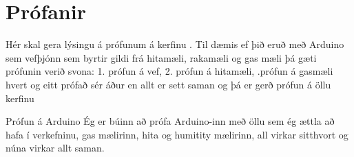 \section{Prófanir}
Hér skal gera lýsingu á prófunum á kerfinu . Til dæmis ef þið eruð með Arduino sem vefþjónn sem byrtir gildi frá hitamæli, rakamæli og gas mæli þá gæti prófunin verið svona: 1. prófun á vef, 2. prófun á hitamæli, .prófun á gasmæli hvert og eitt prófað sér áður en allt er sett saman og þá er gerð prófun á öllu kerfinu

Prófun á Arduino
Ég er búinn að prófa Arduino-inn með öllu sem ég ættla að hafa í verkefninu, gas mælirinn, hita og humitity mælirinn, all virkar sitthvort og núna virkar allt saman.
